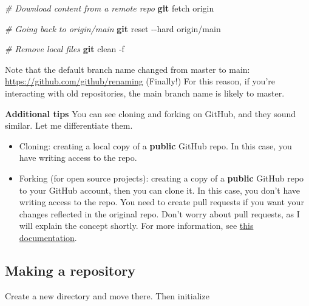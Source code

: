 \documentclass[
]{book}
\newenvironment{Shaded}{\begin{snugshade}}{\end{snugshade}}
\newcommand{\AttributeTok}[1]{\textcolor[rgb]{0.13,0.29,0.53}{#1}}
\newcommand{\CommentTok}[1]{\textcolor[rgb]{0.56,0.35,0.01}{\textit{#1}}}
\newcommand{\ExtensionTok}[1]{#1}
\newcommand{\FunctionTok}[1]{\textcolor[rgb]{0.13,0.29,0.53}{\textbf{#1}}}
\newcommand{\NormalTok}[1]{#1}
\begin{document}
\begin{Shaded}
\begin{Highlighting}[]
\CommentTok{\# Download content from a remote repo}
\FunctionTok{git}\NormalTok{ fetch origin}

\CommentTok{\# Going back to origin/main}
\FunctionTok{git}\NormalTok{ reset }\AttributeTok{{-}{-}hard}\NormalTok{ origin/main}

\CommentTok{\# Remove local files}
\FunctionTok{git}\NormalTok{ clean }\AttributeTok{{-}f}
\end{Highlighting}
\end{Shaded}

Note that the default branch name changed from master to main: \url{https://github.com/github/renaming} (Finally!) For this reason, if you're interacting with old repositories, the main branch name is likely to master.

\textbf{Additional tips}
You can see cloning and forking on GitHub, and they sound similar. Let me differentiate them.

\begin{itemize}
\item
  Cloning: creating a local copy of a \textbf{public} GitHub repo. In this case, you have writing access to the repo.
\item
  Forking (for open source projects): creating a copy of a \textbf{public} GitHub repo to your GitHub account, then you can clone it. In this case, you don't have writing access to the repo. You need to create pull requests if you want your changes reflected in the original repo. Don't worry about pull requests, as I will explain the concept shortly. For more information, see \href{https://docs.github.com/en/desktop/contributing-and-collaborating-using-github-desktop/cloning-and-forking-repositories-from-github-desktop}{this documentation}.
\end{itemize}

\subsection{Making a repository}\label{making-a-repository}

Create a new directory and move there.
Then initialize

\begin{Shaded}
\end{Shaded}
\end{document}
